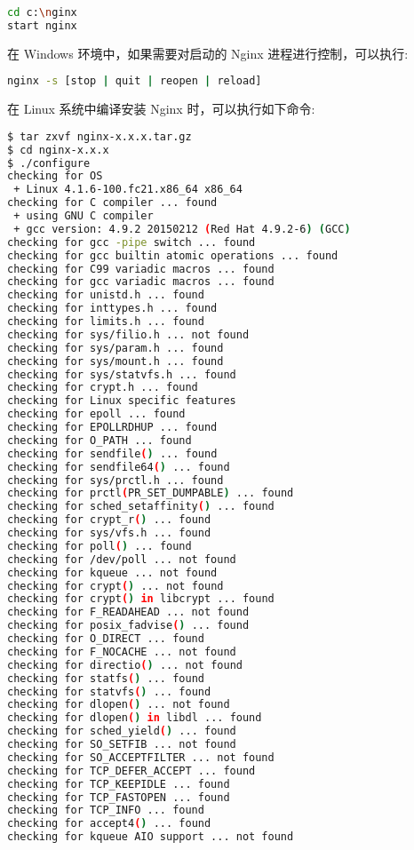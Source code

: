 \begin{lstlisting}[language=bash]
cd c:\nginx
start nginx
\end{lstlisting}


在 Windows 环境中，如果需要对启动的 Nginx 进程进行控制，可以执行:

\begin{lstlisting}[language=bash]
nginx -s [stop | quit | reopen | reload]
\end{lstlisting}


在 Linux 系统中编译安装 Nginx 时，可以执行如下命令:

\begin{lstlisting}[language=bash]
$ tar zxvf nginx-x.x.x.tar.gz
$ cd nginx-x.x.x
$ ./configure
checking for OS
 + Linux 4.1.6-100.fc21.x86_64 x86_64
checking for C compiler ... found
 + using GNU C compiler
 + gcc version: 4.9.2 20150212 (Red Hat 4.9.2-6) (GCC) 
checking for gcc -pipe switch ... found
checking for gcc builtin atomic operations ... found
checking for C99 variadic macros ... found
checking for gcc variadic macros ... found
checking for unistd.h ... found
checking for inttypes.h ... found
checking for limits.h ... found
checking for sys/filio.h ... not found
checking for sys/param.h ... found
checking for sys/mount.h ... found
checking for sys/statvfs.h ... found
checking for crypt.h ... found
checking for Linux specific features
checking for epoll ... found
checking for EPOLLRDHUP ... found
checking for O_PATH ... found
checking for sendfile() ... found
checking for sendfile64() ... found
checking for sys/prctl.h ... found
checking for prctl(PR_SET_DUMPABLE) ... found
checking for sched_setaffinity() ... found
checking for crypt_r() ... found
checking for sys/vfs.h ... found
checking for poll() ... found
checking for /dev/poll ... not found
checking for kqueue ... not found
checking for crypt() ... not found
checking for crypt() in libcrypt ... found
checking for F_READAHEAD ... not found
checking for posix_fadvise() ... found
checking for O_DIRECT ... found
checking for F_NOCACHE ... not found
checking for directio() ... not found
checking for statfs() ... found
checking for statvfs() ... found
checking for dlopen() ... not found
checking for dlopen() in libdl ... found
checking for sched_yield() ... found
checking for SO_SETFIB ... not found
checking for SO_ACCEPTFILTER ... not found
checking for TCP_DEFER_ACCEPT ... found
checking for TCP_KEEPIDLE ... found
checking for TCP_FASTOPEN ... found
checking for TCP_INFO ... found
checking for accept4() ... found
checking for kqueue AIO support ... not found

\end{lstlisting}
